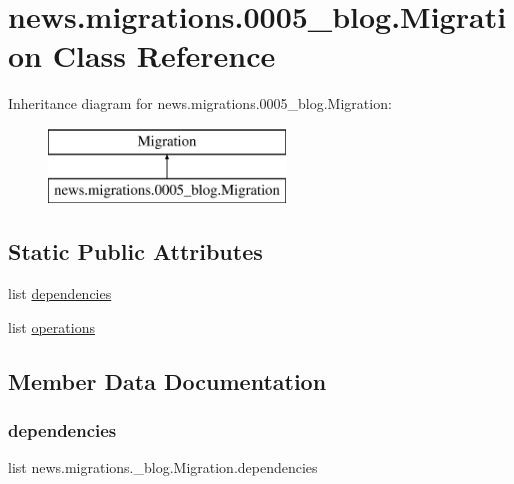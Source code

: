 \hypertarget{classnews_1_1migrations_1_10005__blog_1_1_migration}{}\section{news.\+migrations.0005\+\_\+blog.Migration Class Reference}
\label{classnews_1_1migrations_1_10005__blog_1_1_migration}
Inheritance diagram for news.\+migrations.0005\+\_\+blog.Migration\+:\begin{figure}[H]
\begin{center}
\leavevmode
\includegraphics[height=2.000000cm]{classnews_1_1migrations_1_10005__blog_1_1_migration}
\end{center}
\end{figure}
\subsection*{Static Public Attributes}
\begin{DoxyCompactItemize}
\item 
list \mbox{\hyperlink{classnews_1_1migrations_1_10005__blog_1_1_migration_a67fe13fe5bba063eb0b2f6814e84dd44}{dependencies}}
\item 
list \mbox{\hyperlink{classnews_1_1migrations_1_10005__blog_1_1_migration_ac1237edc72e8630319b2134ee14c3305}{operations}}
\end{DoxyCompactItemize}


\subsection{Member Data Documentation}
\mbox{\label{classnews_1_1migrations_1_10005__blog_1_1_migration_a67fe13fe5bba063eb0b2f6814e84dd44}} 
\subsubsection{\texorpdfstring{dependencies}{dependencies}}
{\footnotesize\ttfamily list news.\+migrations.\+\_\+blog.\+Migration.\+dependencies\hspace{0.3cm}{\ttfamily [static]}}

